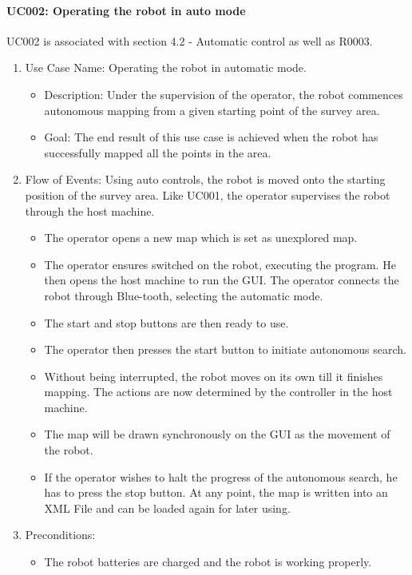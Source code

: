 \documentclass[11pt, a4paper]{report}
\begin{document}
\paragraph {UC002: Operating the robot in auto mode}
UC002 is associated with section 4.2 - Automatic control as well as R0003.
\begin{enumerate}
	\item Use Case Name: Operating the robot in automatic mode.
	\begin{itemize}
		\item Description: Under the supervision of the operator, the robot commences autonomous mapping from a given starting point of the survey area.
		\item Goal: The end result of this use case is achieved when the robot has successfully mapped all the points in the area.
	\end{itemize}
	\item  Flow of Events: Using auto controls, the robot is moved onto the starting position of the
survey area. Like UC001, the operator supervises the robot through the host machine.
	\begin{itemize}
		\item The operator opens a new map which is set as unexplored map.  
		\item The operator ensures switched on the robot, executing the program. He then
opens the host machine to run the GUI. The operator connects the robot through Blue-tooth, selecting the automatic mode.
		\item The start and stop buttons are then ready to use.
		\item The operator then presses the start button to initiate autonomous search.
		\item Without being interrupted, the robot moves on its own till it finishes mapping. The actions are now determined by the controller in the host machine.
		\item The map will be drawn synchronously on the GUI as the movement of the robot.  
		\item If the operator wishes to halt the progress of the autonomous search, he has to press the stop button. At any point, the map is written into an XML File and can be loaded again for later
using.
	\end{itemize}
	\item Preconditions:
	\begin{itemize}
		\item The robot batteries are charged and the robot is working properly.

\end{itemize}
\end{enumerate}
\end{document}
